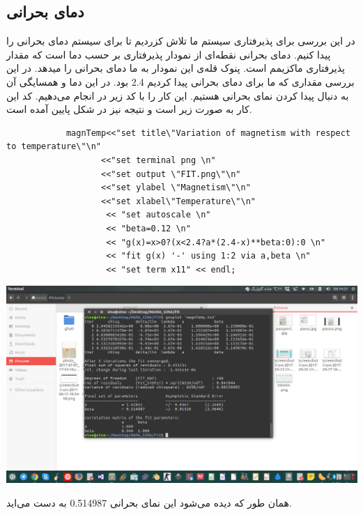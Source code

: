 \documentclass[a4paper,12pt]{article}
\begin{document}
\subsection{دمای بحرانی}
در این بررسی برای پذیرفتاری سیستم ما تلاش کزردیم تا برای سیستم
دمای بحرانی را پیدا کنیم.
دمای بحرانی نقطه‌ای از نمودار پذیرفتاری بر حسب دما است که مقدار پذیرفتاری
ماکزیمم است.
پنوک قله‌ی این نمودار به ما دمای بحرانی
را میدهد.
در این بررسی مقداری که ما برای دمای بحرانی پیدا کردیم 2.4 بود.
در این دما و همسایگی آن به دنبال پیدا کردن نمای بحرانی هستیم.
این کار را با کد زیر در
انجام می‌دهیم.
کد این کار به صورت زیر است و نتیجه نیز در شکل پایین آمده است.
\begin{lstlisting}
            magnTemp<<"set title\"Variation of magnetism with respect to temperature\"\n"
                   <<"set terminal png \n"
                   <<"set output \"FIT.png\"\n"
                   <<"set ylabel \"Magnetism\"\n"
                   <<"set xlabel\"Temperature\"\n"
                    << "set autoscale \n"
                    << "beta=0.12 \n"
                    << "g(x)=x>0?(x<2.4?a*(2.4-x)**beta:0):0 \n"
                    << "fit g(x) '-' using 1:2 via a,beta \n"
                    << "set term x11" << endl;	
\end{lstlisting}
\begin{center}
 \includegraphics[scale=.3]{10.png}
\end{center}
همان طور که دیده می‌شود این نمای بحرانی 0.514987
به دست می‌اید.
\end{document}
